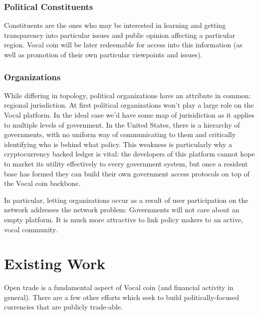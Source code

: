 \documentclass[conference]{IEEEtran}
\newcommand{\cmmnt}[1]{}
\begin{document}
    \subsubsection{Political Constituents}
    Constituents are the ones who may be interested in learning and getting transparency into particular issues and public opinion affecting a particular region. Vocal coin will be later redeemable for access into this information (as well as promotion of their own particular viewpoints and issues).

    \subsubsection{Organizations}
    While differing in topology, political organizations have an attribute in common: regional jurisdiction. At first political organizations won't play a large role on the Vocal platform. In the ideal case we'd have some map of jurisidiction as it applies to multiple levels of government. In the United States, there is a hierarchy of governments, with no uniform way of communicating to them and critically identifying who is behind what policy. This weakness is particularly why a cryptocurrency backed ledger is vital: the developers of this platform cannot hope to market its utility effectively to every government system, but once a resident base has formed they can build their own government access protocols on top of the Vocal coin backbone.

    In particular, letting organizations occur as a result of user participation on the network addresses the network problem: Governments will not care about an empty platform. It is much more attractive to link policy makers to an active, vocal community. 


    \section{Existing Work}
    Open trade is a fundamental aspect of Vocal coin (and financial activity in general). There are a few other efforts which seek to build politically-focused currencies that are publicly trade-able.

    \cmmnt{TODO: insert relevant other example of blockchain powered campaign.}
\end{document}
